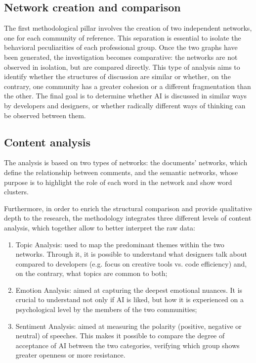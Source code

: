 \documentclass[conference]{IEEEtran}
\begin{document}
\subsection{Network creation and comparison}
The first methodological pillar involves the creation of two independent networks, one for each community of reference. This separation is essential to isolate the behavioral peculiarities of each professional group. Once the two graphs have been generated, the investigation becomes comparative: the networks are not observed in isolation, but are compared directly. This type of analysis aims to identify whether the structures of discussion are similar or whether, on the contrary, one community has a greater cohesion or a different fragmentation than the other. The final goal is to determine whether AI is discussed in similar ways by developers and designers, or whether radically different ways of thinking can be observed between them.

\subsection{Content analysis}
The analysis is based on two types of networks: the documents’ networks, which define the relationship between comments, and the semantic networks, whose purpose is to highlight the role of each word in the network and show word clusters.

Furthermore, in order to enrich the structural comparison and provide qualitative depth to the research, the methodology integrates three different levels of content analysis, which together allow to better interpret the raw data:

\begin{enumerate}[label= (\alph*)]
    \item Topic Analysis: used to map the predominant themes within the two networks. Through it, it is possible to understand what designers talk about compared to developers (e.g. focus on creative tools vs. code efficiency) and, on the contrary, what topics are common to both;
    \item Emotion Analysis: aimed at capturing the deepest emotional nuances. It is crucial to understand not only if AI is liked, but how it is experienced on a psychological level by the members of the two communities;
    \item Sentiment Analysis: aimed at measuring the polarity (positive, negative or neutral) of speeches. This makes it possible to compare the degree of acceptance of AI between the two categories, verifying which group shows greater openness or more resistance.
\end{enumerate}
\end{document}

